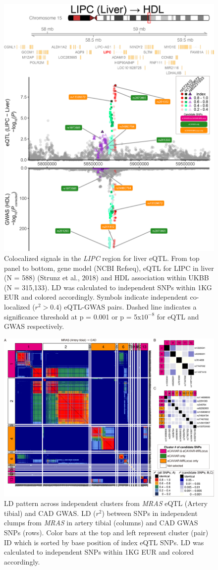 \documentclass[11pt]{article}
\begin{document}
\begin{figure}[!ht]
  \centering
  \includegraphics[width=.7\textwidth]{figs/region/regionplot.LIPC_Liver_HDL_UKBB.20201218.edit.png}
  \caption{Colocalized signals in the \emph{LIPC} region for liver eQTL. From top
    panel to bottom, gene model (NCBI Refseq), eQTL for LIPC in liver
    (N = 588) (Strunz et al., 2018) and HDL association within UKBB (N
    = 315,133). LD was calculated to independent SNPs within 1KG EUR
    and colored accordingly. Symbols indicate independent co-localized
    ($r^2> 0.4$) eQTL-GWAS pairs. Dashed line indicates a significance
    threshold at p = 0.001 or p = 5x$10^{-8}$ for eQTL and GWAS
    respectively.} 
\end{figure}

\begin{figure}[!ht]
  \centering
  \includegraphics[width=.7\textwidth]{figs/region/heatmap_eQTLbase.Artery_MRAS_CAD.20201217.png}
  \caption{LD pattern across independent clusters from \emph{MRAS}
    eQTL (Artery tibial) and CAD GWAS. LD ($r^2$) between SNPs in
    independent clumps from \emph{MRAS} in artery tibial (columns) and
    CAD GWAS SNPs (rows). Color bars at the top and left represent
    cluster (pair) ID which is sorted by base position of index eQTL
    SNPs. LD was calculated to independent SNPs within 1KG EUR and
    colored accordingly.}
  \label{fig:ld1}
\end{figure}
\end{document}

